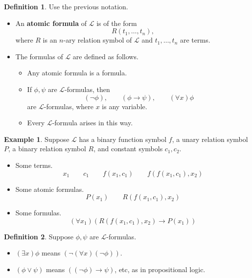 \documentclass{article}
\renewcommand{\L}{\mathcal{L}}
\newcommand{\rb}[1]{\left( #1 \right)}
\newcommand{\notb}[1]{\rb{\neg #1}}
\newcommand{\orb}[2]{\rb{#1 \lor #2}}
\newcommand{\impb}[2]{\rb{#1 \rightarrow #2}}
\newcommand{\fab}[1]{\rb{\forall #1}}
\newcommand{\teb}[1]{\rb{\exists #1}}
\theoremstyle{definition}\newtheorem{definition}{Definition}[subsection]
\theoremstyle{definition}\newtheorem{remark1}[definition]{Remark}
\theoremstyle{definition}\newtheorem{example1}[definition]{Example}
\theoremstyle{definition}\newtheorem*{remark2}{Remark}
\theoremstyle{definition}\newtheorem*{example2}{Example}
\theoremstyle{definition}\newtheorem*{note}{Note}
\theoremstyle{definition}\newtheorem*{notation}{Notation}
\begin{document}

\begin{definition}
Use the previous notation.
\begin{itemize}
\item An \textbf{atomic formula} of $ \L $ is of the form
$$ R\rb{t_1, \dots, t_n}, $$
where $ R $ is an $ n $-ary relation symbol of $ \L $ and $ t_1, \dots, t_n $ are terms.
\item The formulas of $ \L $ are defined as follows.
\begin{itemize}
\item Any atomic formula is a formula.
\item If $ \phi, \psi $ are $ \L $-formulas, then
$$ \notb{\phi}, \qquad \impb{\phi}{\psi}, \qquad \fab{x}\phi $$
are $ \L $-formulas, where $ x $ is any variable.
\item Every $ \L $-formula arises in this way.
\end{itemize}
\end{itemize}
\end{definition}

\begin{example2}
Suppose $ \L $ has a binary function symbol $ f $, a unary relation symbol $ P $, a binary relation symbol $ R $, and constant symbols $ c_1, c_2 $.
\begin{itemize}
\item Some terms.
$$ x_1 \qquad c_1 \qquad f\rb{x_1, c_1} \qquad f\rb{f\rb{x_1, c_1}, x_2} $$
\item Some atomic formulas.
$$ P\rb{x_1} \qquad R\rb{f\rb{x_1, c_1}, x_2} $$
\item Some formulas.
$$ \fab{x_1}\impb{R\rb{f\rb{x_1, c_1}, x_2}}{P\rb{x_1}} $$
\end{itemize}
\end{example2}

\begin{definition}
Suppose $ \phi, \psi $ are $ \L $-formulas.
\begin{itemize}
\item $ \teb{x}\phi $ means $ \notb{\fab{x}\notb{\phi}} $.
\item $ \orb{\phi}{\psi} $ means $ \impb{\notb{\phi}}{\psi} $, etc, as in propositional logic.
\end{itemize}
\end{definition}

\pagebreak
\end{document}
